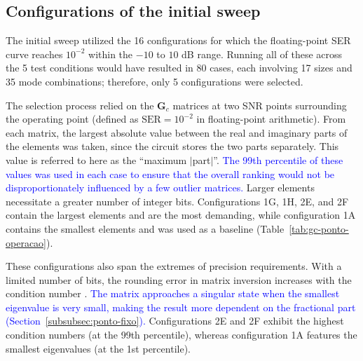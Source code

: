 \subsection{\texorpdfstring{Configurations of the initial sweep}{Configurations of the initial sweep}}
The initial sweep utilized the 16 configurations for which the floating-point SER curve reaches $10^{-2}$ within the $-10$ to $10$ dB range. Running all of these across the 5 test conditions would have resulted in 80 cases, each involving 17 sizes and 35 mode combinations; therefore, only 5 configurations were selected.


The selection process relied on the $\mathbf{G}_c$ matrices at two SNR points surrounding the operating point (defined as $\mathrm{SER} = 10^{-2}$ in floating-point arithmetic). From each matrix, the largest absolute value between the real and imaginary parts of the elements was taken, since the circuit stores the two parts separately. This value is referred to here as the ``maximum $|$part$|$''. \textcolor{blue}{The 99th percentile of these values was used in each case to ensure that the overall ranking would not be disproportionately influenced by a few outlier matrices.} Larger elements necessitate a greater number of integer bits. Configurations 1G, 1H, 2E, and 2F contain the largest elements and are the most demanding, while configuration 1A contains the smallest elements and was used as a baseline (Table~\ref{tab:gc-ponto-operacao}).


These configurations also span the extremes of precision requirements. With a limited number of bits, the rounding error in matrix inversion increases with the condition number \cite[p.~1603]{osinsky2023}. \textcolor{blue}{The matrix approaches a singular state when the smallest eigenvalue is very small, making the result more dependent on the fractional part (Section~\ref{subsubsec:ponto-fixo}).} Configurations 2E and 2F exhibit the highest condition numbers (at the 99th percentile), whereas configuration 1A features the smallest eigenvalues (at the 1st percentile).


